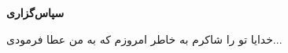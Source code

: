 \clearpage
\thispagestyle{empty}

{\BNazaninScaleOne
{\fontsize{20pt}{0}\selectfont \bfseries
\noindent
سپاس‌گزاری
}}
\vspace{0.5cm}

{\BNazaninScaleOne
{\fontsize{12pt}{0.9cm}\selectfont %
\noindent
خدایا تو را شاکرم به خاطر امروزم که به من عطا فرمودی...






}}

\restoregeometry